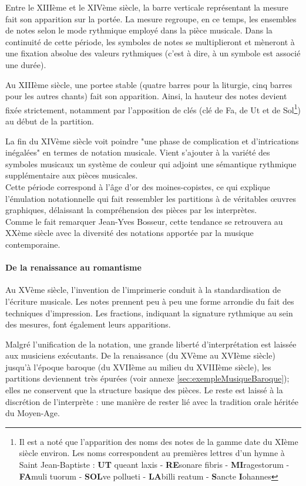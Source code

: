 Entre le XIIIème et le XIVème siècle, la barre verticale représentant la mesure fait son apparition sur la portée. La mesure regroupe, en ce temps, les ensembles de notes selon le mode rythmique employé dans la pièce musicale.
Dans la continuité de cette période, les symboles de notes se multiplieront et mèneront à une fixation absolue des valeurs rythmiques (c'est à dire, à un symbole est associé une durée).

Au XIIIème siècle, une \gls{portee} stable (quatre barres pour la liturgie, cinq barres pour les autres chants) fait son apparition. Ainsi, la hauteur des notes devient fixée strictement, notamment par l'apposition de clés (clé de Fa, de Ut et de Sol\footnote{Il est a noté que l'apparition des noms des notes de la gamme date du XIème siècle environ. Les noms correspondent au premières lettres d'un hymne à Saint Jean-Baptiste :
\textbf{UT} queant laxis - \textbf{RE}sonare fibris - \textbf{MI}ragestorum - \textbf{FA}muli tuorum -  \textbf{SOL}ve pollueti - \textbf{LA}billi reatum - \textbf{S}ancte \textbf{I}ohannes}) au début de la partition.

La fin du XIVème siècle voit poindre "une phase de complication et d'intrications inégalées"\cite[43]{bosseur2005} en termes de notation musicale. Vient s'ajouter à la variété des symboles musicaux un système de couleur qui adjoint une sémantique rythmique supplémentaire aux pièces musicales.\\
Cette période correspond à l'âge d'or des moines-copistes, ce qui explique l'émulation notationnelle qui fait ressembler les partitions à de véritables œuvres graphiques, délaissant la compréhension des pièces par les interprètes. \\
Comme le fait remarquer Jean-Yves Bosseur, cette tendance se retrouvera au XXème siècle avec la diversité des notations apportée par la musique contemporaine. 
   
\paragraph{De la renaissance au romantisme} Au XVème siècle, l'invention de l'imprimerie conduit à la standardisation de l'écriture musicale. Les notes prennent peu à peu une forme arrondie du fait des techniques d'impression. Les fractions, indiquant la signature rythmique au sein des mesures, font également leurs apparitions. 

Malgré l'unification de la notation, une grande liberté d'interprétation est laissée aux musiciens exécutants. De la renaissance (du XVème au XVIème siècle) jusqu'à l'époque baroque (du XVIIème au milieu du XVIIIème siècle), les partitions deviennent très épurées (voir annexe \ref{sec:exempleMusiqueBaroque}); elles ne conservent que la structure basique des pièces. Le reste est laissé à la discrétion de l'interprète : une manière de rester lié avec la tradition orale héritée du Moyen-Age.

